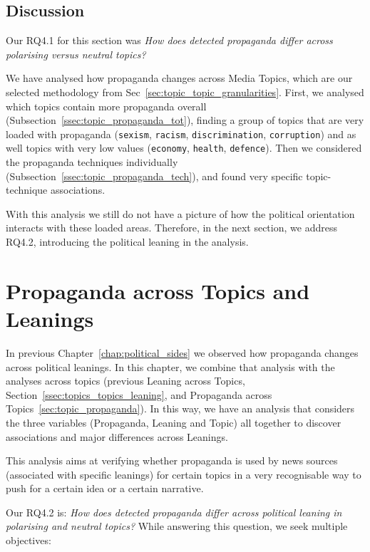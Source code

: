 \subsection{\statusgreen Discussion}

Our RQ4.1 for this section was \emph{How does detected propaganda differ across polarising versus neutral topics?}

We have analysed how propaganda changes across Media Topics, which are our selected methodology from Sec~\ref{sec:topic_topic_granularities}.
First, we analysed which topics contain more propaganda overall (Subsection~\ref{ssec:topic_propaganda_tot}), finding a group of topics that are very loaded with propaganda (\texttt{sexism}, \texttt{racism}, \texttt{discrimination}, \texttt{corruption}) and as well topics with very low values (\texttt{economy}, \texttt{health}, \texttt{defence}).
Then we considered the propaganda techniques individually (Subsection~\ref{ssec:topic_propaganda_tech}), and found very specific topic-technique associations.

With this analysis we still do not have a picture of how the political orientation interacts with these loaded areas. Therefore, in the next section, we address RQ4.2, introducing the political leaning in the analysis.



\section{\statusgreen Propaganda across Topics and Leanings}
\label{sec:topic_propaganda_leaning}

In previous Chapter~\ref{chap:political_sides} we observed how propaganda changes across political leanings.
In this chapter, we combine that analysis with the analyses across topics (previous Leaning across Topics, Section~\ref{ssec:topics_topics_leaning}, and Propaganda across Topics~\ref{sec:topic_propaganda}).
In this way, we have an analysis that considers the three variables (Propaganda, Leaning and Topic) all together to discover associations and major differences across Leanings.

This analysis aims at verifying whether propaganda is used by news sources (associated with specific leanings) for certain topics in a very recognisable way to push for a certain idea or a certain narrative.

Our RQ4.2 is: \emph{How does detected propaganda differ across political leaning in polarising and neutral topics?}
While answering this question, we seek multiple objectives:

